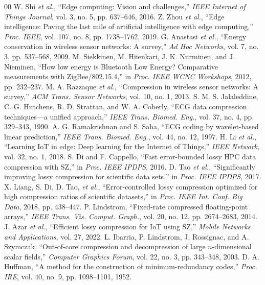 \documentclass[journal]{IEEEtran}
\begin{document}
\begin{thebibliography}{00}
 W. Shi \emph{et al.}, ``Edge computing: Vision and challenges,'' \emph{IEEE Internet of Things Journal}, vol. 3, no. 5, pp. 637--646, 2016.
 Z. Zhou \emph{et al.}, ``Edge intelligence: Paving the last mile of artificial intelligence with edge computing,'' \emph{Proc. IEEE}, vol. 107, no. 8, pp. 1738--1762, 2019.
 G. Anastasi \emph{et al.}, ``Energy conservation in wireless sensor networks: A survey,'' \emph{Ad Hoc Networks}, vol. 7, no. 3, pp. 537--568, 2009.
 M. Siekkinen, M. Hiienkari, J. K. Nurminen, and J. Nieminen, ``How low energy is Bluetooth Low Energy? Comparative measurements with ZigBee/802.15.4,'' in \emph{Proc. IEEE WCNC Workshops}, 2012, pp. 232--237.
 M. A. Razzaque \emph{et al.}, ``Compression in wireless sensor networks: A survey,'' \emph{ACM Trans. Sensor Networks}, vol. 10, no. 1, 2013.
 S. M. S. Jalaleddine, C. G. Hutchens, R. D. Strattan, and W. A. Coberly, ``ECG data compression techniques---a unified approach,'' \emph{IEEE Trans. Biomed. Eng.}, vol. 37, no. 4, pp. 329--343, 1990.
 A. G. Ramakrishnan and S. Saha, ``ECG coding by wavelet-based linear prediction,'' \emph{IEEE Trans. Biomed. Eng.}, vol. 44, no. 12, 1997.
 H. Li \emph{et al.}, ``Learning IoT in edge: Deep learning for the Internet of Things,'' \emph{IEEE Network}, vol. 32, no. 1, 2018.
 S. Di and F. Cappello, ``Fast error-bounded lossy HPC data compression with SZ,'' in \emph{Proc. IEEE IPDPS}, 2016.
 D. Tao \emph{et al.}, ``Significantly improving lossy compression for scientific data sets,'' in \emph{Proc. IEEE IPDPS}, 2017.
 X. Liang, S. Di, D. Tao, \emph{et al.}, ``Error-controlled lossy compression optimized for high compression ratios of scientific datasets,'' in \emph{Proc. IEEE Int. Conf. Big Data}, 2018, pp. 438--447.
 P. Lindstrom, ``Fixed-rate compressed floating-point arrays,'' \emph{IEEE Trans. Vis. Comput. Graph.}, vol. 20, no. 12, pp. 2674--2683, 2014.
 J. Azar \emph{et al.}, ``Efficient lossy compression for IoT using SZ,'' \emph{Mobile Networks and Applications}, vol. 27, 2022.
 L. Ibarria, P. Lindstrom, J. Rossignac, and A. Szymczak, ``Out-of-core compression and decompression of large $n$-dimensional scalar fields,'' \emph{Computer Graphics Forum}, vol. 22, no. 3, pp. 343--348, 2003.
 D. A. Huffman, ``A method for the construction of minimum-redundancy codes,'' \emph{Proc. IRE}, vol. 40, no. 9, pp. 1098--1101, 1952.

\end{thebibliography}
\end{document}

